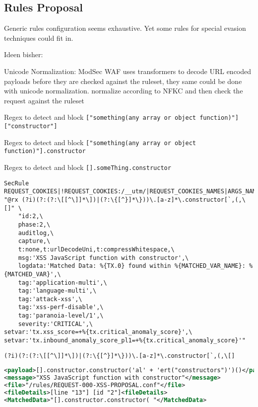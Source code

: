 \subsection{Rules Proposal}
\label{sec:rulesproposal}
Generic rules configuration seems exhaustive. Yet some rules for special evasion techniques could fit in.

{\color{red}Ideen bisher:}

Unicode Normalization: ModSec WAF uses transformers to decode URL encoded payloads before they are checked against the ruleset, they same could be done with unicode normalization. normalize according to NFKC and then check the request against the ruleset 

Regex to detect and block \verb|["something(any array or object function)"]["constructor"]|

Regex to detect and block \verb|["something(any array or object function)"].constructor|

Regex to detect and block \verb|[].someThing.constructor|

\begin{lstlisting}[style=basicStyle, caption=rule proposal to block usage of function constructor, label={lst:constructorsruleproposal}]
SecRule REQUEST_COOKIES|!REQUEST_COOKIES:/__utm/|REQUEST_COOKIES_NAMES|ARGS_NAMES|ARGS|REQUEST_FILENAME|XML:/* "@rx (?i)(?:(?:\[[^\]]*\])|(?:\{[^}]*\}))\.[a-z]*\.constructor[`,(,\[]" \
    "id:2,\
    phase:2,\
    auditlog,\
    capture,\
    t:none,t:urlDecodeUni,t:compressWhitespace,\
    msg:'XSS JavaScript function with constructor',\
    logdata:'Matched Data: %{TX.0} found within %{MATCHED_VAR_NAME}: %{MATCHED_VAR}',\
    tag:'application-multi',\
    tag:'language-multi',\
    tag:'attack-xss',\
    tag:'xss-perf-disable',\
    tag:'paranoia-level/1',\
    severity:'CRITICAL',\                                                                               setvar:'tx.xss_score=+%{tx.critical_anomaly_score}',\                                               setvar:'tx.inbound_anomaly_score_pl1=+%{tx.critical_anomaly_score}'"
\end{lstlisting}

\begin{lstlisting}[style=basicStyle, caption=regex of rule proposal 2, label={lst:constructorsruleproposalregex}]
  (?i)(?:(?:\[[^\]]*\])|(?:\{[^}]*\}))\.[a-z]*\.constructor[`,(,\[]
\end{lstlisting}

\begin{lstlisting}[style=ruleStyle, language=XML, caption=using constructors rule poc, label={lst:constructorsblockedpoc}]
<payload>[].constructor.constructor('al' + 'ert("constructors")')()</payload>
<message>"XSS JavaScript function with constructor"</message>
<file>"/rules/REQUEST-000-XSS-PROPOSAL.conf"</file>
<fileDetails>[line "13"] [id "2"]<fileDetails>
<MatchedData>"[].constructor.constructor( "</MatchedData>
\end{lstlisting}

